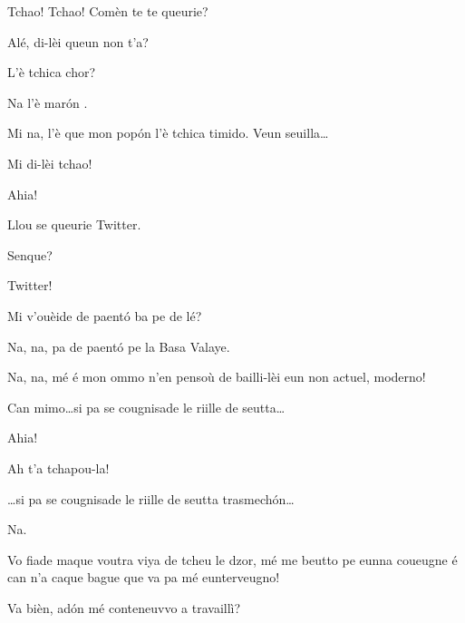 \begin{drama}

\Tantaspeaks Tchao!  Tchao! Comèn te te queurie?


\Alicespeaks{} Alé, di-lèi queun non t'a?


\Tantaspeaks L'è tchica chor?

\Tanteunspeaks Na l'è mar\'on .

\Alicespeaks Mi na, l'è que mon pop\'on l'è tchica timido.  Veun seuilla\ldots


\Tanteunspeaks{} Mi di-lèi tchao!


\Twitterspeaks Ahia!

\Alicespeaks{} Llou se queurie Twitter.

\Tantaspeaks{} Senque? 

\Alicespeaks Twitter!

\Tantaspeaks Mi v'ouèide de paent\'o ba pe de lé?

\Tanteunspeaks Na, na, pa de paent\'o pe la Basa Valaye.

\Alicespeaks Na, na, mé é mon ommo n’en pensoù de bailli-lèi eun non actuel, moderno!

\Tantaspeaks Can mimo\ldots si pa se cougnisade le riille de seutta\ldots


\Twitterspeaks{} Ahia!

\Tanteunspeaks{} Ah t'a tchapou-la!

\Tantaspeaks \ldots si pa se cougnisade le riille de seutta trasmech\'on\ldots

\Alicespeaks Na.

\Tantaspeaks Vo fiade maque voutra viya de tcheu le dzor, mé me beutto pe eunna coueugne é can n'a caque bague que va pa  mé eunterveugno!

\Tanteunspeaks{} Va bièn, ad\'on mé conteneuvvo a travaillì?


\end{drama}
